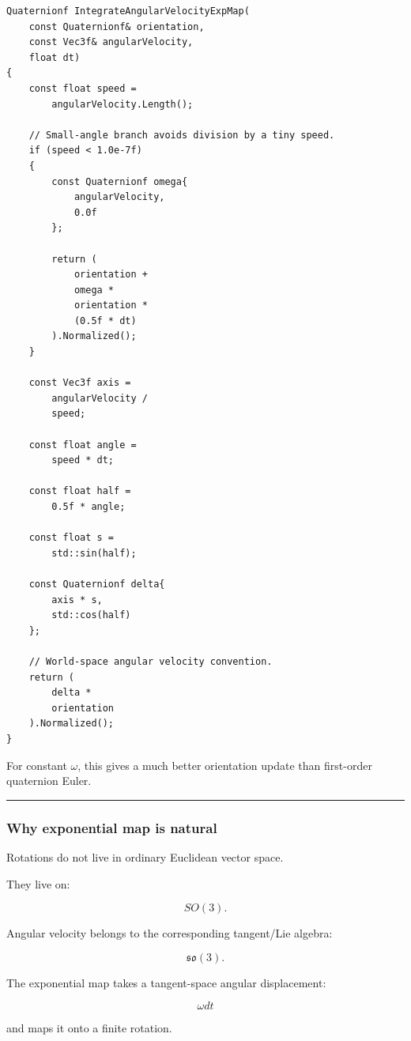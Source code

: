\begin{verbatim}
Quaternionf IntegrateAngularVelocityExpMap(
    const Quaternionf& orientation,
    const Vec3f& angularVelocity,
    float dt)
{
    const float speed =
        angularVelocity.Length();

    // Small-angle branch avoids division by a tiny speed.
    if (speed < 1.0e-7f)
    {
        const Quaternionf omega{
            angularVelocity,
            0.0f
        };

        return (
            orientation +
            omega *
            orientation *
            (0.5f * dt)
        ).Normalized();
    }

    const Vec3f axis =
        angularVelocity /
        speed;

    const float angle =
        speed * dt;

    const float half =
        0.5f * angle;

    const float s =
        std::sin(half);

    const Quaternionf delta{
        axis * s,
        std::cos(half)
    };

    // World-space angular velocity convention.
    return (
        delta *
        orientation
    ).Normalized();
}
\end{verbatim}

For constant \(\omega\), this gives a much better orientation update than first-order quaternion Euler.

\begin{center}\rule{0.5\linewidth}{0.5pt}\end{center}

\subsubsection{Why exponential map is natural}\label{why-exponential-map-is-natural}

Rotations do not live in ordinary Euclidean vector space.

They live on:

\[
SO(3).
\]

Angular velocity belongs to the corresponding tangent/Lie algebra:

\[
\mathfrak{so}(3).
\]

The exponential map takes a tangent-space angular displacement:

\[
\omega dt
\]

and maps it onto a finite rotation.

